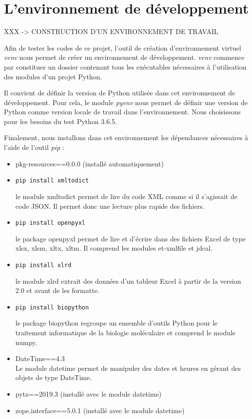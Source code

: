 \documentclass[twoside,a4paper,11pt,frenchb,openany]{report}
\begin{document}
\section{L'environnement de développement}

 XXX -> CONSTRUCTION D'UN ENVIRONNEMENT DE TRAVAIL

Afin de tester les codes de ce projet, l'outil de création d'environnement virtuel \textit{venv}  nous permet de créer un environnement de développement. \textit{venv} commence par constituer un dossier contenant tous les exécutables nécessaires à l'utilisation des modules d'un projet Python.

Il convient de définir la version de Python utilisée dans cet environnement de développement. Pour cela, le module \textit{pyenv}  nous permet de définir une version de Python comme version locale de travail dans l'environnement. Nous choisissons pour les besoins du test Python 3.6.5.

Finalement, nous installons dans cet environnement les dépendances nécessaires à l'aide de l'outil \textit{pip}  :
\begin{itemize}
\item pkg-resources==0.0.0 (installé automatiquement)
\item \begin{tcolorbox}\texttt{pip install xmltodict}\end{tcolorbox}
le module xmltodict permet de lire du code XML comme si il s'agissait de code JSON. Il permet donc une lecture plus rapide des fichiers.
\item  \begin{tcolorbox}\texttt{pip install openpyxl}\end{tcolorbox}
le package openpyxl permet de lire et d'écrire dans des fichiers Excel de type xlsx, xlsm, xltx, xltm. Il comprend les modules et-xmlfile et jdcal.
\item  \begin{tcolorbox}\texttt{pip install xlrd}\end{tcolorbox}
le module xlrd extrait des données d'un tableur Excel à partir de la version 2.0 et avant de les formatte.
\item  \begin{tcolorbox}\texttt{pip install biopython}\end{tcolorbox}
le package biopython regroupe un ensemble d'outils Python pour le traitement informatique de la biologie moléculaire et comprend le module numpy.
\item DateTime==4.3\\
Le module datetime permet de manipuler des dates et heures en gérant des objets de type DateTime. 
\item pytz==2019.3 (installé avec le module datetime)
\item zope.interface==5.0.1 (installé avec le module datetime)
\end{itemize}
\end{document}

